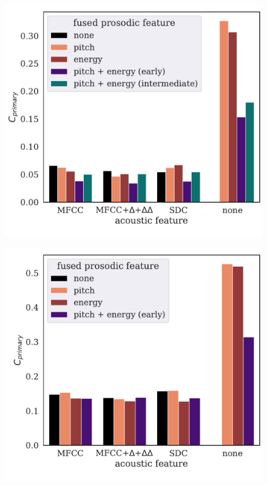 \documentclass[bsc,frontabs,twoside,singlespacing,parskip,deptreport]{infthesis}
\begin{document}
{{\begin{figure}[h!t]
\begin{minipage}{0.49\textwidth}
        \includegraphics[width=\textwidth]{../img/summary-intermediate-10s.pdf}
        \label{fig:summary-intermediate-10s}
      \end{minipage}
      \begin{minipage}{0.49\textwidth}
        \centering
        \vspace*{1.5em}      
        \includegraphics[width=\textwidth]{../img/summary-early-3s.pdf}

\end{minipage}
\end{figure}}}
\end{document}

